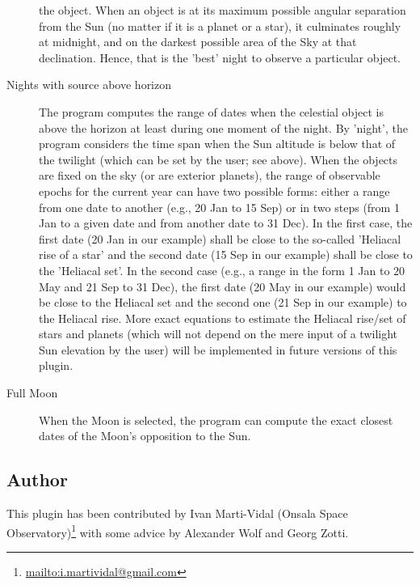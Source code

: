 \begin{description}
  the object. When an object is at its maximum possible angular
  separation from the Sun (no matter if it is a planet or a star), it
  culminates roughly at midnight, and on the darkest possible area of
  the Sky at that declination. Hence, that is the 'best' night to
  observe a particular object.
\item[Nights with source above horizon] The program computes the range
  of dates when the celestial object is above the horizon at least
  during one moment of the night. By 'night', the program considers
  the time span when the Sun altitude is below that of the twilight
  (which can be set by the user; see above). When the objects are
  fixed on the sky (or are exterior planets), the range of observable
  epochs for the current year can have two possible forms: either a
  range from one date to another (e.g., 20 Jan to 15 Sep) or in two
  steps (from 1 Jan to a given date and from another date to 31
  Dec). In the first case, the first date (20 Jan in our example)
  shall be close to the so-called 'Heliacal rise of a star' and the
  second date (15 Sep in our example) shall be close to the 'Heliacal
  set'. In the second case (e.g., a range in the form 1 Jan to 20 May
  and 21 Sep to 31 Dec), the first date (20 May in our example) would
  be close to the Heliacal set and the second one (21 Sep in our
  example) to the Heliacal rise. More exact equations to estimate the
  Heliacal rise/set of stars and planets (which will not depend on the
  mere input of a twilight Sun elevation by the user) will be
  implemented in future versions of this plugin.
\item[Full Moon] When the Moon is selected, the program can compute
  the exact closest dates of the Moon's opposition to the Sun.
\end{description}

\subsection*{Author}
\label{sec:plugins:Observability:author}
This plugin has been contributed by Ivan Marti-Vidal (Onsala Space Observatory)\footnote{\url{mailto:i.martividal@gmail.com}} with some advice by Alexander Wolf and Georg Zotti.





